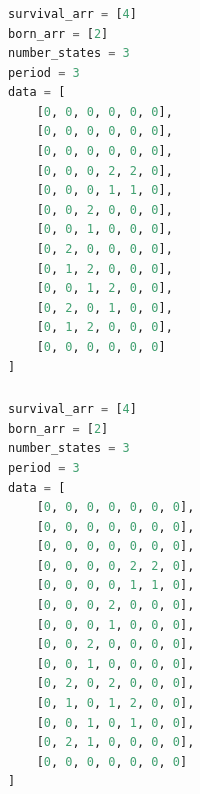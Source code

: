\documentclass[12pt]{article}
\numberwithin{figure}{section} %
\begin{document}
\noindent\begin{minipage}{.45\textwidth}
\subsubsection{}
\begin{lstlisting}[language = Python]
survival_arr = [4]
born_arr = [2]
number_states = 3
period = 3
data = [
    [0, 0, 0, 0, 0, 0],
    [0, 0, 0, 0, 0, 0],
    [0, 0, 0, 0, 0, 0],
    [0, 0, 0, 2, 2, 0],
    [0, 0, 0, 1, 1, 0],
    [0, 0, 2, 0, 0, 0],
    [0, 0, 1, 0, 0, 0],
    [0, 2, 0, 0, 0, 0],
    [0, 1, 2, 0, 0, 0],
    [0, 0, 1, 2, 0, 0],
    [0, 2, 0, 1, 0, 0],
    [0, 1, 2, 0, 0, 0],
    [0, 0, 0, 0, 0, 0]
]
\end{lstlisting}
\end{minipage}\hfill
\begin{minipage}{.45\textwidth}
\subsubsection{}
\begin{lstlisting}[language = Python]
survival_arr = [4]
born_arr = [2]
number_states = 3
period = 3
data = [
    [0, 0, 0, 0, 0, 0, 0],
    [0, 0, 0, 0, 0, 0, 0],
    [0, 0, 0, 0, 0, 0, 0],
    [0, 0, 0, 0, 2, 2, 0],
    [0, 0, 0, 0, 1, 1, 0],
    [0, 0, 0, 2, 0, 0, 0],
    [0, 0, 0, 1, 0, 0, 0],
    [0, 0, 2, 0, 0, 0, 0],
    [0, 0, 1, 0, 0, 0, 0],
    [0, 2, 0, 2, 0, 0, 0],
    [0, 1, 0, 1, 2, 0, 0],
    [0, 0, 1, 0, 1, 0, 0],
    [0, 2, 1, 0, 0, 0, 0],
    [0, 0, 0, 0, 0, 0, 0]
]
\end{lstlisting}
\end{minipage}
\end{document}
